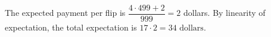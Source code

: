 The expected payment per flip is $\dfrac{4\cdot499+2}{999}=2$ dollars. By linearity of expectation, the total expectation is $17\cdot2=\boxed{34\text{ dollars}}$.
